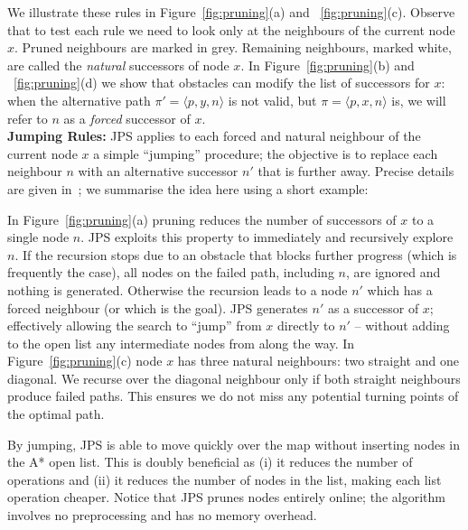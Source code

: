 We illustrate these rules in Figure~\ref{fig:pruning}(a) and ~\ref{fig:pruning}(c).
Observe that to test each rule we need to look only at
the neighbours of the current node $x$. 
Pruned neighbours are marked in grey. Remaining neighbours, marked
white, are called the \emph{natural} successors of node $x$.  
In Figure~\ref{fig:pruning}(b) and ~\ref{fig:pruning}(d) we show
that obstacles can modify the list of successors for $x$:
when the alternative path $\pi' = \langle p, y, n \rangle$ is
not valid, but $\pi = \langle p, x, n \rangle$ is, we will refer to $n$ as
a \emph{forced} successor of $x$.
\\ \newline
\textbf{Jumping Rules:}
JPS applies to each forced and natural neighbour of the current node $x$ a simple
``jumping'' procedure; the objective is to replace each neighbour $n$ with an 
alternative successor $n'$ that is further away. Precise details are given
in~\cite{harabor11b}; we summarise the idea here using a short example:

\begin{example}
In Figure~\ref{fig:pruning}(a) pruning reduces the number
of successors of $x$ to a single node $n$.
JPS exploits this property to immediately and recursively
explore $n$.
If the recursion stops due to an obstacle that blocks further progress
(which is frequently the case), all nodes on the failed path, including $n$, are ignored
and nothing is generated.
Otherwise the recursion leads to a node $n'$ which has a forced
neighbour (or which is the goal). JPS generates $n'$ as a successor of $x$; 
effectively allowing the search to ``jump'' from $x$ directly to $n'$ -- without adding
to the open list any intermediate nodes from along the way.
In Figure~\ref{fig:pruning}(c) node $x$ has three natural neighbours: two straight and one diagonal.
We recurse over the diagonal neighbour only if both straight neighbours produce
failed paths. This ensures we do not miss any potential turning points of the optimal path.
\end{example}

%
By jumping, JPS is able to move quickly over the map 
without inserting nodes in the A* open list.
This is doubly beneficial as (i) it reduces the number of operations 
and (ii) it reduces the number of nodes in the list, 
making each list operation cheaper.  
Notice that JPS prunes nodes entirely online; the algorithm involves no preprocessing and has no memory overhead.  

